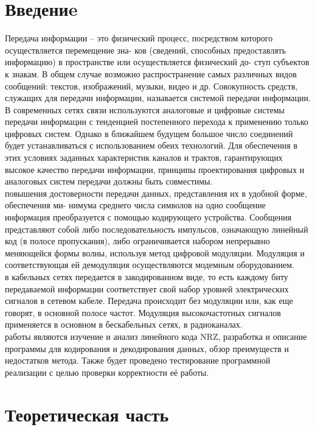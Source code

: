 \documentclass[a4paper14pt]{article}
\begin{document}
\newpage
\setcounter{page}{3}
\tableofcontents
\newpage
\section{Введениe}
Передача информации – это физический процесс, посредством которого осуществляется перемещение зна- ков (сведений, способных предоставлять информацию) в пространстве или осуществляется физический до- ступ субъектов к знакам. В общем случае возможно распространение самых различных видов сообщений: текстов, изображений, музыки, видео и др. Совокупность средств, служащих для передачи информации, называется системой передачи информации.\\
\indent В современных сетях связи используются аналоговые и цифровые системы передачи информации с тенденцией постепенного перехода к применению только цифровых систем. Однако в ближайшем будущем большое число соединений будет устанавливаться с использованием обеих технологий. Для обеспечения в этих условиях заданных характеристик каналов и трактов, гарантирующих высокое качество передачи информации, принципы проектирования цифровых и аналоговых систем передачи должны быть совместимы.\\
 повышения достоверности передачи данных, представления их в удобной форме, обеспечения ми- нимума среднего числа символов на одно сообщение информация преобразуется с помощью кодирующего устройства. Сообщения представляют собой либо последовательность импульсов, означающую линейный код (в полосе пропускания), либо ограничивается набором непрерывно меняющейся формы волны, используя метод цифровой модуляции. Модуляция и соответствующая ей демодуляция осуществляются модемным оборудованием.\\
 в кабельных сетях передается в закодированном виде, то есть каждому биту передаваемой информации соответствует свой набор уровней электрических сигналов в сетевом кабеле. Передача происходит без модуляции или, как еще говорят, в основной полосе частот. Модуляция высокочастотных сигналов применяется в основном в бескабельных сетях, в радиоканалах.\\
 работы являются изучение и анализ линейного кода NRZ, разработка и описание программы для кодирования и декодирования данных, обзор преимуществ и недостатков метода. Также будет проведено тестирование программной реализации с целью проверки корректности её работы.\\
\newpage
\section{Теоретическая часть}
\end{document}
